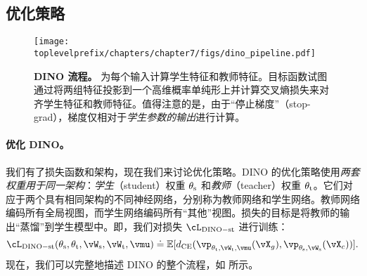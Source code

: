 \documentclass[../../book-main.tex]{subfiles}
\begin{document}
\subsection{优化策略}\label{sub:contrastive_learning_optimization}

\begin{figure}
    \centering 
    \texttt{[image: \\toplevelprefix/chapters/chapter7/figs/dino\_pipeline.pdf]}
    \caption{\small \textbf{DINO 流程。} 为每个输入计算学生特征和教师特征。目标函数试图通过将两组特征投影到一个高维概率单纯形上并计算交叉熵损失来对齐学生特征和教师特征。值得注意的是，由于“停止梯度”（stop-grad），梯度仅相对于\textit{学生参数的输出}进行计算。}
    \label{fig:dino_pipeline}
\end{figure}

\paragraph{优化 DINO。} 我们有了损失函数和架构，现在我们来讨论优化策略。DINO 的优化策略使用\textit{两套权重用于同一架构}：\textit{学生}（student）权重 \(\theta_{\mathrm{s}}\) 和\textit{教师}（teacher）权重 \(\theta_{\mathrm{t}}\)。它们对应于两个具有相同架构的不同神经网络，分别称为教师网络和学生网络。教师网络编码所有全局视图，而学生网络编码所有“其他”视图。损失的目标是将教师的输出“蒸馏”到学生模型中。即，我们对损失 \(\cL_{\dino{}-\student\teacher}\) 进行训练：
\begin{equation}\label{eq:dino_loss_teacherstudent}
    \cL_{\dino{}-\student\teacher}(\theta_{\student}, \theta_{\teacher}, \vW_{\student}, \vW_{\teacher}, \vmu) \doteq \Ex[d_{\CE}(\vp_{\theta_{\teacher}, \vW_{\teacher}, \vmu}(\vX_{g}), \vp_{\theta_{\student}, \vW_{\student}}(\vX_{c}))].
\end{equation}
现在，我们可以完整地描述 DINO 的整个流程，如  所示。
\end{document}
